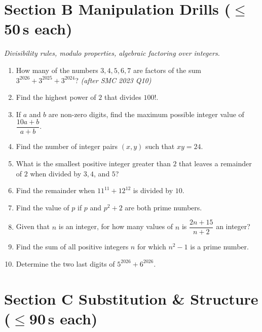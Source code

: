 \documentclass[11pt,a4paper]{article}
\begin{document}
\section*{Section B \quad Manipulation Drills \hfill{\normalfont\small($\leq$50\,s each)}}

\noindent\textit{Divisibility rules, modulo properties, algebraic factoring over integers.}

\begin{enumerate}

\item How many of the numbers $3, 4, 5, 6, 7$ are factors of the sum $3^{2026} + 3^{2025} + 3^{2024}$? \textit{\small(after SMC 2023 Q10)}

\item Find the highest power of $2$ that divides $100!$.

\item If $a$ and $b$ are non-zero digits, find the maximum possible integer value of $\dfrac{10a+b}{a+b}$.

\item Find the number of integer pairs $(x,y)$ such that $xy = 24$.

\item What is the smallest positive integer greater than $2$ that leaves a remainder of $2$ when divided by $3, 4$, and $5$?

\item Find the remainder when $11^{11} + 12^{12}$ is divided by $10$.

\item Find the value of $p$ if $p$ and $p^2+2$ are both prime numbers.

\item Given that $n$ is an integer, for how many values of $n$ is $\dfrac{2n+15}{n+2}$ an integer?

\item Find the sum of all positive integers $n$ for which $n^2-1$ is a prime number.

\item Determine the two last digits of $5^{2026} + 6^{2026}$.

\end{enumerate}

\section*{Section C \quad Substitution \& Structure \hfill{\normalfont\small($\leq$90\,s each)}}
\end{document}
